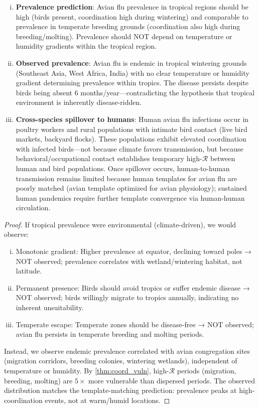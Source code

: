 \documentclass[11pt,twocolumn,a4paper]{article}
\newcommand{\Coord}{\mathcal{R}}
\begin{document}
\begin{theorem}
\begin{enumerate}[(i)]
\item \textbf{Prevalence prediction}: Avian flu prevalence in tropical regions should be high (birds present, coordination high during wintering) and comparable to prevalence in temperate breeding grounds (coordination also high during breeding/molting). Prevalence should NOT depend on temperature or humidity gradients within the tropical region.

\item \textbf{Observed prevalence}: Avian flu is endemic in tropical wintering grounds (Southeast Asia, West Africa, India) with no clear temperature or humidity gradient determining prevalence within tropics. The disease persists despite birds being absent 6 months/year—contradicting the hypothesis that tropical environment is inherently disease-ridden.

\item \textbf{Cross-species spillover to humans}: Human avian flu infections occur in poultry workers and rural populations with intimate bird contact (live bird markets, backyard flocks). These populations exhibit elevated coordination with infected birds—not because climate favors transmission, but because behavioral/occupational contact establishes temporary high-$\Coord$ between human and bird populations. Once spillover occurs, human-to-human transmission remains limited because human templates for avian flu are poorly matched (avian template optimized for avian physiology); sustained human pandemics require further template convergence via human-human circulation.
\end{enumerate}
\end{theorem}

\begin{proof}
If tropical prevalence were environmental (climate-driven), we would observe:
\begin{enumerate}[(i)]
\item Monotonic gradient: Higher prevalence at equator, declining toward poles → NOT observed; prevalence correlates with wetland/wintering habitat, not latitude.
\item Permanent presence: Birds should avoid tropics or suffer endemic disease → NOT observed; birds willingly migrate to tropics annually, indicating no inherent unsuitability.
\item Temperate escape: Temperate zones should be disease-free → NOT observed; avian flu persists in temperate breeding and molting periods.
\end{enumerate}
Instead, we observe endemic prevalence correlated with avian congregation sites (migration corridors, breeding colonies, wintering wetlands), independent of temperature or humidity. By \cref{thm:coord_vuln}, high-$\Coord$ periods (migration, breeding, molting) are $5\times$ more vulnerable than dispersed periods. The observed distribution matches the template-matching prediction: prevalence peaks at high-coordination events, not at warm/humid locations.
\end{proof}
\end{document}

